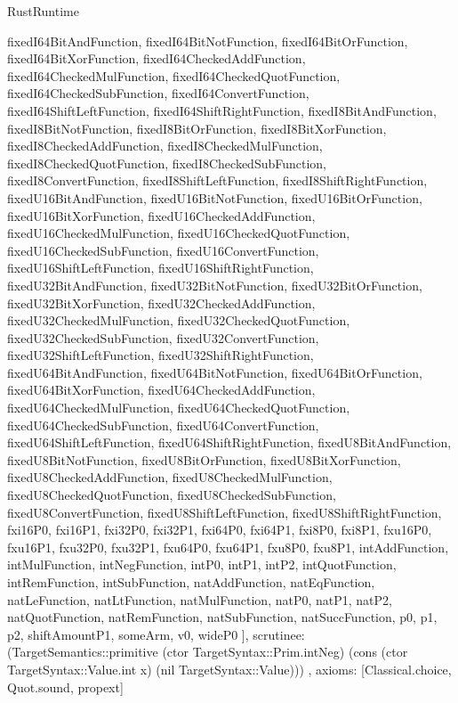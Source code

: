 \begin{lexlean}{RustRuntime}
\begin{semanticmodule}
{{      fixedI64BitAndFunction,
      fixedI64BitNotFunction,
      fixedI64BitOrFunction,
      fixedI64BitXorFunction,
      fixedI64CheckedAddFunction,
      fixedI64CheckedMulFunction,
      fixedI64CheckedQuotFunction,
      fixedI64CheckedSubFunction,
      fixedI64ConvertFunction,
      fixedI64ShiftLeftFunction,
      fixedI64ShiftRightFunction,
      fixedI8BitAndFunction,
      fixedI8BitNotFunction,
      fixedI8BitOrFunction,
      fixedI8BitXorFunction,
      fixedI8CheckedAddFunction,
      fixedI8CheckedMulFunction,
      fixedI8CheckedQuotFunction,
      fixedI8CheckedSubFunction,
      fixedI8ConvertFunction,
      fixedI8ShiftLeftFunction,
      fixedI8ShiftRightFunction,
      fixedU16BitAndFunction,
      fixedU16BitNotFunction,
      fixedU16BitOrFunction,
      fixedU16BitXorFunction,
      fixedU16CheckedAddFunction,
      fixedU16CheckedMulFunction,
      fixedU16CheckedQuotFunction,
      fixedU16CheckedSubFunction,
      fixedU16ConvertFunction,
      fixedU16ShiftLeftFunction,
      fixedU16ShiftRightFunction,
      fixedU32BitAndFunction,
      fixedU32BitNotFunction,
      fixedU32BitOrFunction,
      fixedU32BitXorFunction,
      fixedU32CheckedAddFunction,
      fixedU32CheckedMulFunction,
      fixedU32CheckedQuotFunction,
      fixedU32CheckedSubFunction,
      fixedU32ConvertFunction,
      fixedU32ShiftLeftFunction,
      fixedU32ShiftRightFunction,
      fixedU64BitAndFunction,
      fixedU64BitNotFunction,
      fixedU64BitOrFunction,
      fixedU64BitXorFunction,
      fixedU64CheckedAddFunction,
      fixedU64CheckedMulFunction,
      fixedU64CheckedQuotFunction,
      fixedU64CheckedSubFunction,
      fixedU64ConvertFunction,
      fixedU64ShiftLeftFunction,
      fixedU64ShiftRightFunction,
      fixedU8BitAndFunction,
      fixedU8BitNotFunction,
      fixedU8BitOrFunction,
      fixedU8BitXorFunction,
      fixedU8CheckedAddFunction,
      fixedU8CheckedMulFunction,
      fixedU8CheckedQuotFunction,
      fixedU8CheckedSubFunction,
      fixedU8ConvertFunction,
      fixedU8ShiftLeftFunction,
      fixedU8ShiftRightFunction,
      fxi16P0,
      fxi16P1,
      fxi32P0,
      fxi32P1,
      fxi64P0,
      fxi64P1,
      fxi8P0,
      fxi8P1,
      fxu16P0,
      fxu16P1,
      fxu32P0,
      fxu32P1,
      fxu64P0,
      fxu64P1,
      fxu8P0,
      fxu8P1,
      intAddFunction,
      intMulFunction,
      intNegFunction,
      intP0,
      intP1,
      intP2,
      intQuotFunction,
      intRemFunction,
      intSubFunction,
      natAddFunction,
      natEqFunction,
      natLeFunction,
      natLtFunction,
      natMulFunction,
      natP0,
      natP1,
      natP2,
      natQuotFunction,
      natRemFunction,
      natSubFunction,
      natSuccFunction,
      p0,
      p1,
      p2,
      shiftAmountP1,
      someArm,
      v0,
      wideP0
    ],
    scrutinee: (TargetSemantics::primitive (ctor TargetSyntax::Prim.intNeg) (cons (ctor TargetSyntax::Value.int x) (nil TargetSyntax::Value)))
  },
  axioms: [Classical.choice, Quot.sound, propext]
}


\end{semanticmodule}
\end{lexlean}
